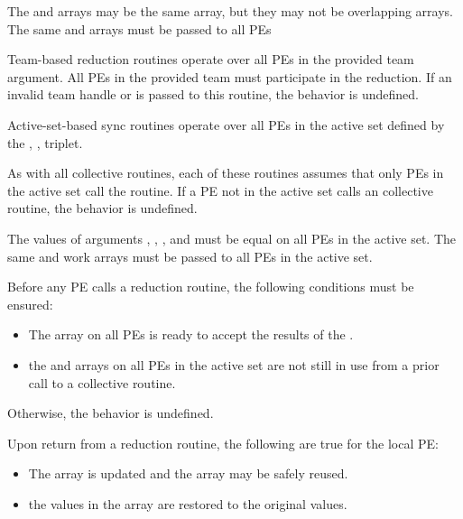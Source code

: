 \begin{apidefinition}
{    The \source{} and \dest{} arrays may be the same array, but they may not be
    overlapping arrays. The same \dest{} and \source{} arrays
    must be passed to all \acp{PE} 

{\color{Green}
    Team-based reduction routines operate over all \acp{PE} in the provided team argument. All
    \acp{PE} in the provided team must participate in the reduction. If an invalid team handle
    or  is passed to this routine, the behavior is undefined.

    Active-set-based sync routines operate over all \acp{PE} in the active set
    defined by the , ,  triplet.
}

    As with all \oldtext{\openshmem}  collective routines,
    each of these routines assumes
    that only \acp{PE} in the active set call the routine.  If a \ac{PE} not in
    the active set calls an \oldtext{\openshmem}  collective routine,
    the behavior is undefined.

    The values of arguments , , ,
    and  must be equal on all \acp{PE} in the active set.
    The same  and  work arrays must be passed to all
    \acp{PE} in the active set.

    Before any \ac{PE} calls a reduction routine, the following conditions must be ensured:
    \begin{itemize}
    \item The \dest{} array on all \acp{PE} 
      is ready to accept the results of the .
    \item {} the
       and  arrays on all \acp{PE} in the
      active set are not still in use from a prior call to a collective
      \openshmem routine.
    \end{itemize}
    Otherwise, the behavior is undefined.
    
    Upon return from a reduction routine, the following are true for the local
    \ac{PE}:
    \begin{itemize}
    \item The \dest{} array is updated and the \source{} array may be safely reused.
    \item {}
    the values in the  array are restored to the original values.
    \end{itemize}

}
\end{apidefinition}
